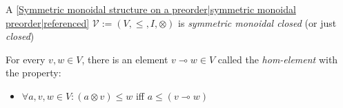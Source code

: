 
A \ref{Symmetric monoidal structure on a preorder|symmetric monoidal preorder|referenced} $\mathcal{V}:=(V,\leq,I,\otimes)$ is \emph{symmetric monoidal closed} (or just \emph{closed})

For every $v,w \in V$, there is an element $v \multimap w \in V$ called the \emph{hom-element} with the property:
\begin{itemize}
  \item  $\forall a,v,w \in V: (a \otimes v) \leq w$ iff $a \leq (v \multimap w)$
\end{itemize}
